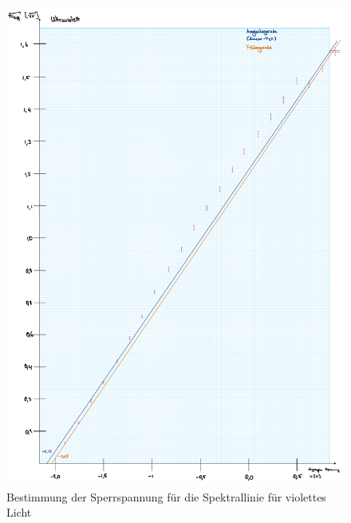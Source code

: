 \begin{figure}[t!]
    \includegraphics[width=1\textwidth, page=2]{img/35/v35-Farbplots.pdf}
    \caption{Bestimmung der Sperrspannung für die Spektrallinie für violettes Licht}
    \label{fig:v}
\end{figure}

\newpage

